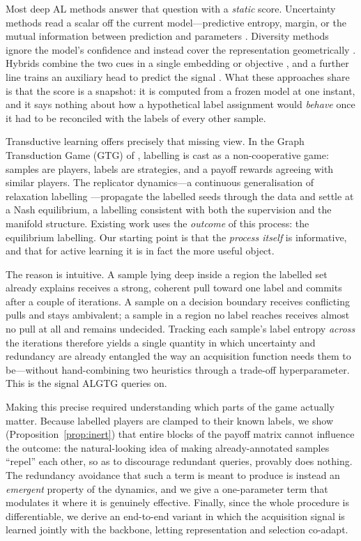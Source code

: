 \documentclass[11pt]{article}
\begin{document}
Most deep AL methods answer that question with a \emph{static} score. Uncertainty
methods read a scalar off the current model---predictive entropy, margin, or the
mutual information between prediction and parameters
\citep{houlsby2011bayesian,gal2017deep}. Diversity methods ignore the model's confidence and instead cover the
representation geometrically \citep{sener2018active}. Hybrids combine the two cues in
a single embedding or objective \citep{ash2020deep,parvaneh2022active}, and a further
line trains an auxiliary head to predict the signal
\citep{yoo2019learning,kim2021task,kye2023tidal}. What these approaches share is that
the score is a snapshot: it is computed from a frozen model at one instant, and it
says nothing about how a hypothetical label assignment would \emph{behave} once it
had to be reconciled with the labels of every other sample.

Transductive learning offers precisely that missing view. In the Graph Transduction
Game (GTG) of \citet{erdem2012graph}, labelling is cast as a non-cooperative game:
samples are players, labels are strategies, and a payoff rewards agreeing with
similar players. The replicator dynamics---a continuous generalisation of relaxation
labelling \citep{pelillo1997dynamics}---propagate the labelled seeds through the data
and settle at a Nash equilibrium, a labelling consistent with both the supervision and
the manifold structure. Existing work uses the \emph{outcome} of this process: the
equilibrium labelling. Our starting point is that the \emph{process itself} is
informative, and that for active learning it is in fact the more useful object.

The reason is intuitive. A sample lying deep inside a region the labelled set already
explains receives a strong, coherent pull toward one label and commits after a couple
of iterations. A sample on a decision boundary receives conflicting pulls and stays
ambivalent; a sample in a region no label reaches receives almost no pull at all and
remains undecided. Tracking each sample's label entropy \emph{across} the iterations
therefore yields a single quantity in which uncertainty and redundancy are already
entangled the way an acquisition function needs them to be---without hand-combining
two heuristics through a trade-off hyperparameter. This is the signal ALGTG queries on.

Making this precise required understanding which parts of the game actually matter.
Because labelled players are clamped to their known labels, we show
(Proposition~\ref{prop:inert}) that entire blocks of the payoff matrix cannot
influence the outcome: the natural-looking idea of making already-annotated samples
``repel'' each other, so as to discourage redundant queries, provably does nothing. The
redundancy avoidance that such a term is meant to produce is instead an
\emph{emergent} property of the dynamics, and we give a one-parameter term that
modulates it where it is genuinely effective. Finally, since the whole procedure is
differentiable, we derive an end-to-end variant in which the acquisition signal is
learned jointly with the backbone, letting representation and selection co-adapt.
\end{document}
